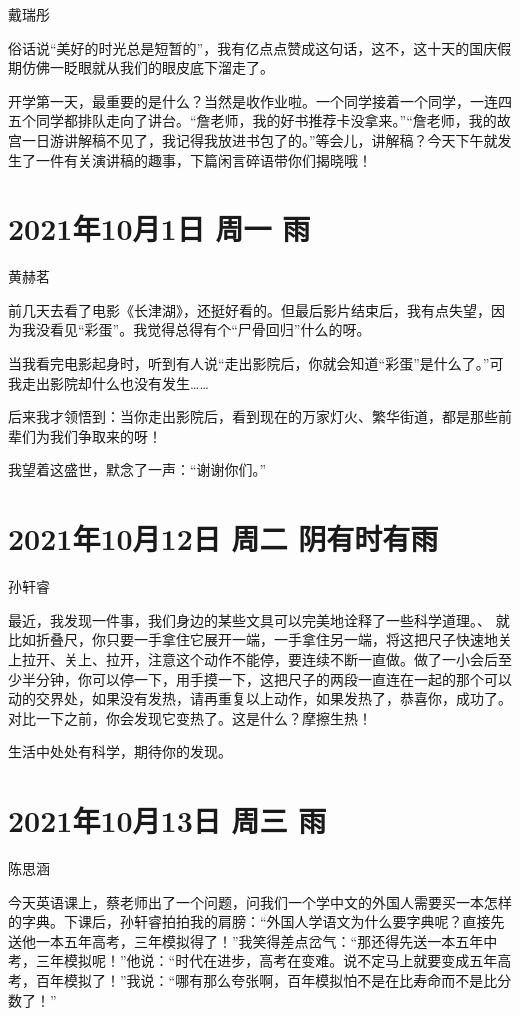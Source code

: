 戴瑞彤

俗话说“美好的时光总是短暂的”，我有亿点点赞成这句话，这不，这十天的国庆假期仿佛一眨眼就从我们的眼皮底下溜走了。

开学第一天，最重要的是什么？当然是收作业啦。一个同学接着一个同学，一连四五个同学都排队走向了讲台。“詹老师，我的好书推荐卡没拿来。”“詹老师，我的故宫一日游讲解稿不见了，我记得我放进书包了的。”等会儿，讲解稿？今天下午就发生了一件有关演讲稿的趣事，下篇闲言碎语带你们揭晓哦！

\section{2021年10月1日 周一 雨}

黄赫茗

前几天去看了电影《长津湖》，还挺好看的。但最后影片结束后，我有点失望，因为我没看见“彩蛋”。我觉得总得有个“尸骨回归”什么的呀。

当我看完电影起身时，听到有人说“走出影院后，你就会知道“彩蛋”是什么了。”可我走出影院却什么也没有发生……

后来我才领悟到：当你走出影院后，看到现在的万家灯火、繁华街道，都是那些前辈们为我们争取来的呀！

我望着这盛世，默念了一声：“谢谢你们。”

\section{2021年10月12日 周二 阴有时有雨}

孙轩睿

最近，我发现一件事，我们身边的某些文具可以完美地诠释了一些科学道理。、
就比如折叠尺，你只要一手拿住它展开一端，一手拿住另一端，将这把尺子快速地关上拉开、关上、拉开，注意这个动作不能停，要连续不断一直做。做了一小会后至少半分钟，你可以停一下，用手摸一下，这把尺子的两段一直连在一起的那个可以动的交界处，如果没有发热，请再重复以上动作，如果发热了，恭喜你，成功了。对比一下之前，你会发现它变热了。这是什么？摩擦生热！

生活中处处有科学，期待你的发现。

\section{2021年10月13日 周三 雨}

陈思涵

今天英语课上，蔡老师出了一个问题，问我们一个学中文的外国人需要买一本怎样的字典。下课后，孙轩睿拍拍我的肩膀：“外国人学语文为什么要字典呢？直接先送他一本五年高考，三年模拟得了！”我笑得差点岔气：“那还得先送一本五年中考，三年模拟呢！”他说：“时代在进步，高考在变难。说不定马上就要变成五年高考，百年模拟了！”我说：“哪有那么夸张啊，百年模拟怕不是在比寿命而不是比分数了！”

